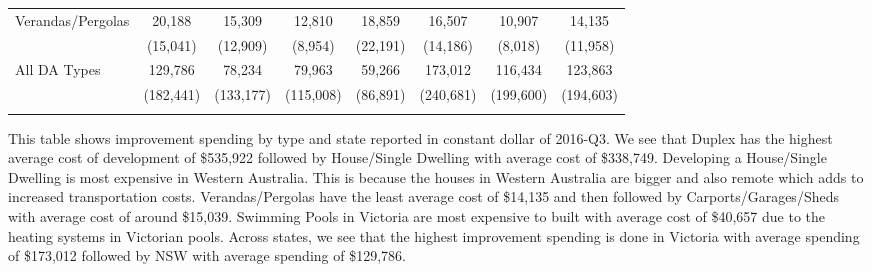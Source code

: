 \begin{table}[t!p]
{\begin{threeparttable}
\begin{tabular}{rccccccc}
    \multicolumn{1}{l}{Verandas/Pergolas} & 20,188 & 15,309 & 12,810 & 18,859 & 16,507 & 10,907 & 14,135 \\
          & (15,041) & (12,909) & (8,954) & (22,191) & (14,186) & (8,018) & (11,958) \\
    \multicolumn{1}{l}{All DA Types} & 129,786 & 78,234 & 79,963 & 59,266 & 173,012 & 116,434 & 123,863 \\
          & (182,441) & (133,177) & (115,008) & (86,891) & (240,681) & (199,600) & (194,603) \\
    \bottomrule \\ [-2ex] 
    \end{tabular}%
   
   \begin{tablenotes}
  \LARGE
     This table shows improvement spending by type and state reported in constant dollar of 2016-Q3. We see that Duplex has the highest average cost of development of \$535,922 followed by House/Single Dwelling with average cost of \$338,749. Developing a House/Single Dwelling is most expensive in Western Australia. This is because the houses in Western Australia are bigger and also remote which adds to increased transportation costs. Verandas/Pergolas have the least average cost of \$14,135 and then followed by Carports/Garages/Sheds with average cost of around \$15,039. Swimming Pools in Victoria are most expensive to built with average cost of \$40,657 due to the heating systems in Victorian pools. Across states, we see that the highest improvement spending is done in Victoria with average spending of \$173,012 followed by NSW with average spending of \$129,786.
\end{tablenotes}   
    
 \end{threeparttable}  
    
    }%
    

\end{table}%
